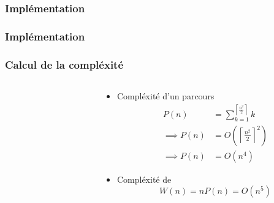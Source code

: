 \begin{frame}
  \frametitle{Implémentation}
\end{frame}

\begin{frame}
  \frametitle{Implémentation}
\end{frame}

\begin{frame}
  \frametitle{Calcul de la compléxité}
  \begin{columns}
    \begin{column}{5cm}
      \hexWorstCase
    \end{column}
    \begin{column}{5cm}
    \begin{itemize}
      \item Compléxité d'un parcours
      \begin{align*}
        P(n) &= \sum^{\left\lceil\frac{n^2}{2}\right\rceil}_{k = 1} k \\
        \implies P(n) &= O\left(\left\lceil\frac{n^2}{2}\right\rceil^2\right) \\
        \implies P(n) &= O\left(n^4\right)
      \end{align*}
      \item Compléxité de 
      \[
        W(n) = n P(n) = O\left(n^5\right)
      \]
    \end{itemize}
    \end{column}
  \end{columns}
\end{frame}

